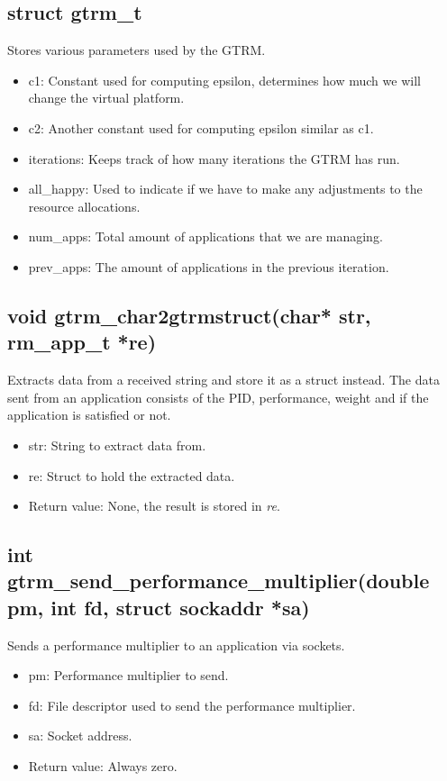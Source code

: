 \documentclass[nobiblatex]{LTHthesis}
\begin{document}
\subsection{struct gtrm\_t}
Stores various parameters used by the GTRM.
\begin{itemize}
\item c1: Constant used for computing epsilon, determines how much we will change the virtual platform.
\item c2: Another constant used for computing epsilon similar as c1.
\item iterations: Keeps track of how many iterations the GTRM has run.
\item all\_happy: Used to indicate if we have to make any adjustments to the resource allocations.
\item num\_apps: Total amount of applications that we are managing.
\item prev\_apps: The amount of applications in the previous iteration.
\end{itemize}

\subsection{void gtrm\_char2gtrmstruct(char* str, rm\_app\_t *re)}
Extracts data from a received string and store it as a struct instead. The data sent from an application consists of the PID, performance, weight and if the application is satisfied or not.
\begin{itemize} 
\item str: String to extract data from.
\item re: Struct to hold the extracted data.
\item Return value: None, the result is stored in \emph{re}.
\end{itemize}

\subsection{int gtrm\_send\_performance\_multiplier(double pm, int fd, struct sockaddr *sa)}
Sends a performance multiplier to an application via sockets.
\begin{itemize} 
\item pm: Performance multiplier to send.
\item fd: File descriptor used to send the performance multiplier.
\item sa: Socket address.
\item Return value: Always zero.
\end{itemize}
\end{document}

